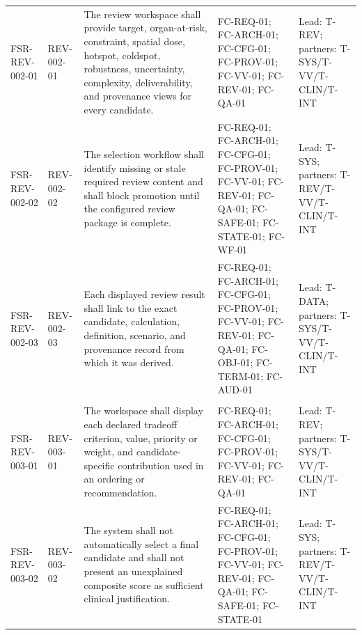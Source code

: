 \documentclass[11pt,letterpaper]{article}
\begin{document}
\begin{scriptsize}
\begin{longtable}{@{}L{0.16\textwidth}L{0.10\textwidth}L{0.31\textwidth}L{0.23\textwidth}L{0.125\textwidth}@{}}
\mbox{FSR-REV-002-01} & \mbox{REV-002-01} & The review workspace shall provide target, organ-at-risk, constraint, spatial dose, hotspot, coldspot, robustness, uncertainty, complexity, deliverability, and provenance views for every candidate. & FC-REQ-01; FC-ARCH-01; FC-CFG-01; FC-PROV-01; FC-VV-01; FC-REV-01; FC-QA-01 & Lead: T-REV; partners: T-SYS\slash\allowbreak{}T-VV\slash\allowbreak{}T-CLIN\slash\allowbreak{}T-INT \\
\addlinespace[2pt]
\mbox{FSR-REV-002-02} & \mbox{REV-002-02} & The selection workflow shall identify missing or stale required review content and shall block promotion until the configured review package is complete. & FC-REQ-01; FC-ARCH-01; FC-CFG-01; FC-PROV-01; FC-VV-01; FC-REV-01; FC-QA-01; FC-SAFE-01; FC-STATE-01; FC-WF-01 & Lead: T-SYS; partners: T-REV\slash\allowbreak{}T-VV\slash\allowbreak{}T-CLIN\slash\allowbreak{}T-INT \\
\addlinespace[2pt]
\mbox{FSR-REV-002-03} & \mbox{REV-002-03} & Each displayed review result shall link to the exact candidate, calculation, definition, scenario, and provenance record from which it was derived. & FC-REQ-01; FC-ARCH-01; FC-CFG-01; FC-PROV-01; FC-VV-01; FC-REV-01; FC-QA-01; FC-OBJ-01; FC-TERM-01; FC-AUD-01 & Lead: T-DATA; partners: T-SYS\slash\allowbreak{}T-VV\slash\allowbreak{}T-CLIN\slash\allowbreak{}T-INT \\
\addlinespace[2pt]
 \\
\mbox{FSR-REV-003-01} & \mbox{REV-003-01} & The workspace shall display each declared tradeoff criterion, value, priority or weight, and candidate-specific contribution used in an ordering or recommendation. & FC-REQ-01; FC-ARCH-01; FC-CFG-01; FC-PROV-01; FC-VV-01; FC-REV-01; FC-QA-01 & Lead: T-REV; partners: T-SYS\slash\allowbreak{}T-VV\slash\allowbreak{}T-CLIN\slash\allowbreak{}T-INT \\
\addlinespace[2pt]
\mbox{FSR-REV-003-02} & \mbox{REV-003-02} & The system shall not automatically select a final candidate and shall not present an unexplained composite score as sufficient clinical justification. & FC-REQ-01; FC-ARCH-01; FC-CFG-01; FC-PROV-01; FC-VV-01; FC-REV-01; FC-QA-01; FC-SAFE-01; FC-STATE-01 & Lead: T-SYS; partners: T-REV\slash\allowbreak{}T-VV\slash\allowbreak{}T-CLIN\slash\allowbreak{}T-INT \\

\end{longtable}
\end{scriptsize}
\end{document}
